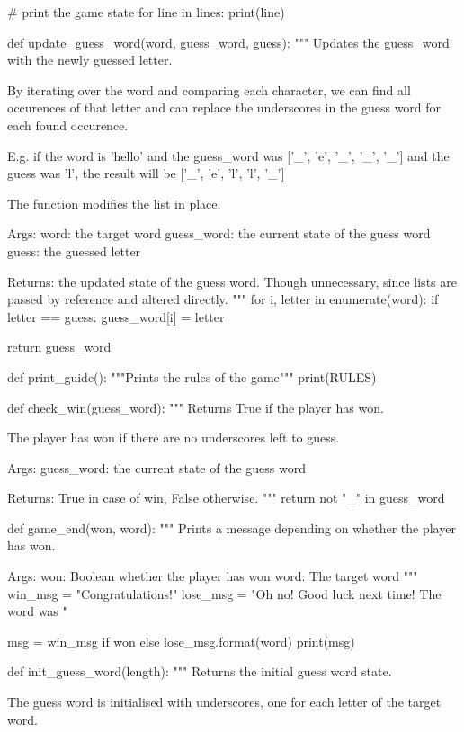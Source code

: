 {\begin{python}
    # print the game state
    for line in lines:
        print(line)


def update_guess_word(word, guess_word, guess):
    """
    Updates the guess_word with the newly guessed letter.

    By iterating over the word and comparing each character, we can find
    all occurences of that letter and can replace the underscores in the
    guess word for each found occurence.

    E.g. if the word is 'hello' and the guess_word was ['_', 'e', '_', '_', '_']
    and the guess was 'l', the result will be ['_', 'e', 'l', 'l', '_']

    The function modifies the list in place.

    Args:
        word: the target word
        guess_word: the current state of the guess word
        guess: the guessed letter
    
    Returns:
        the updated state of the guess word. Though unnecessary, since lists
        are passed by reference and altered directly.
    """
    for i, letter in enumerate(word):
        if letter == guess:
            guess_word[i] = letter

    return guess_word


def print_guide():
    """Prints the rules of the game"""
    print(RULES)


def check_win(guess_word):
    """
    Returns True if the player has won.

    The player has won if there are no underscores left to guess.

    Args:
        guess_word: the current state of the guess word

    Returns:
        True in case of win, False otherwise.
    """
    return not "_" in guess_word


def game_end(won, word):
    """
    Prints a message depending on whether the player has won.
    
    Args:
        won: Boolean whether the player has won
        word: The target word
    """
    win_msg = "Congratulations!"
    lose_msg = "Oh no! Good luck next time! The word was {}"

    msg = win_msg if won else lose_msg.format(word)
    print(msg)


def init_guess_word(length):
    """
    Returns the initial guess word state.

    The guess word is initialised with underscores, one for each letter
    of the target word.


\end{python}}
